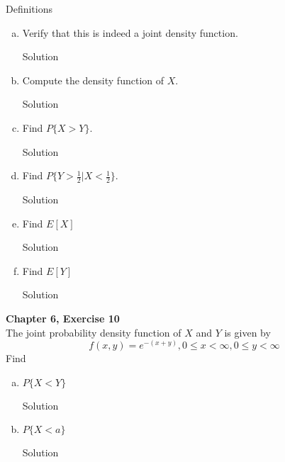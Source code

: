 \documentclass{article}
\begin{document}
\begin{spacing}{1.1}
\begin{homeworkProblem}
\begin{homeworkSection}{Definitions}
  \end{homeworkSection}
  \begin{enumerate}[(a)]
    \item Verify that this is indeed a joint density function.
      \begin{homeworkSection}{Solution}

      \end{homeworkSection}
    \item Compute the density function of $X$.
      \begin{homeworkSection}{Solution}

      \end{homeworkSection}
    \item Find $P\{ X > Y\}$.
      \begin{homeworkSection}{Solution}

      \end{homeworkSection}
    \item Find $P\{ Y > \frac{ 1}{ 2}| X < \frac{ 1}{ 2}\}$.
      \begin{homeworkSection}{Solution}

      \end{homeworkSection}
    \item Find $E[ X]$
      \begin{homeworkSection}{Solution}

      \end{homeworkSection}
    \item Find $E[ Y]$
      \begin{homeworkSection}{Solution}

      \end{homeworkSection}
  \end{enumerate}
\end{homeworkProblem}

\newpage
\begin{homeworkProblem}
  {\bf Chapter 6, Exercise 10}\\
  The joint probability density function of $X$ and $Y$ is given by
    \[f( x, y) = e^{-(x + y)}, 0 \le x < \infty, 0 \le y < \infty\]
  Find 
  \begin{enumerate}[(a)]
    \item $P\{ X < Y\}$
      \begin{homeworkSection}{Solution}
        
      \end{homeworkSection}
    \item $P\{ X < a\}$
      \begin{homeworkSection}{Solution}
        

\end{homeworkSection}
\end{enumerate}
\end{homeworkProblem}
\end{spacing}
\end{document}
